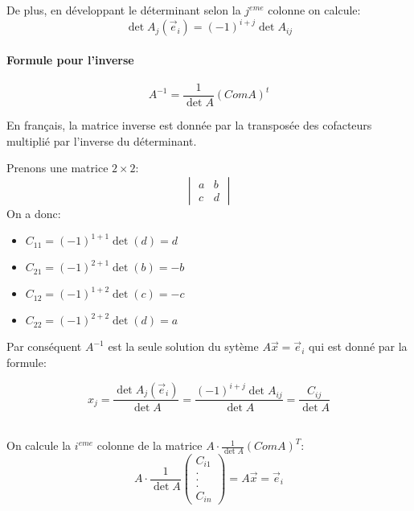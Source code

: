 De plus, en développant le déterminant selon la $j^{eme}$ colonne on calcule:
\[\det A_j(\vec{e}_i) = (-1)^{i+j}\det A_{ij}\]

\paragraph{Formule pour l'inverse}
\begin{definition}
    \begin{equation*}
        A^{-1} = \frac{1}{\det A}(ComA)^t
    \end{equation*}
\end{definition}
En français, la matrice inverse est donnée par la transposée des cofacteurs multiplié par l'inverse du déterminant.

\begin{exemple}
    Prenons une matrice $2 \times 2$:
    \[ \begin{vmatrix}
        a & b \\
        c & d
    \end{vmatrix}
    \]
    On a donc:
    \begin{itemize}
        \item $C_{11} = (-1)^{1+1}\det(d) = d$
        \item $C_{21} = (-1)^{2+1}\det(b) = -b$
        \item $C_{12} = (-1)^{1+2}\det(c) = -c$
        \item $C_{22} = (-1)^{2+2}\det(d) = a$
    \end{itemize}
\end{exemple}
Par conséquent $A^{-1}$ est la seule solution du sytème $A\vec{x} = \vec{e}_i$ qui est donné par la formule:
\begin{formule}

\[
    x_j = \frac{\det A_j (\vec{e}_i)}{\det A} = \frac{(-1)^{i+j}\det A_{ij}}{\det A} = \frac{C_{ij}}{\det A}
\]
\end{formule}
\\
On calcule la $i^{eme}$ colonne de la matrice $A\cdot\frac{1}{\det A}(ComA)^T$:
\[
A\cdot \frac{1}{\det A}\begin{pmatrix}
    C_{i1}\\
    .\\
    . \\
    . \\
    C_{in}
    
\end{pmatrix} = A\vec{x} = \vec{e}_i
\]

